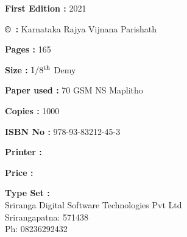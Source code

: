 \begin{center}

\vspace{-.2cm}
{\rm {\bfseries First Edition :} 2021}

\vfill

{\rm {\bfseries \copyright ~:} Karnataka Rajya Vijnana Parishath}

\vfill

{\rm {\bfseries Pages :} 165}

\vfill

{\rm {\bfseries Size :} $1/8^{\rm th}$ Demy}

\vfill

{\rm {\bfseries Paper used :} 70 GSM NS Maplitho}

\vfill

{\rm {\bfseries Copies :} 1000}

\vfill

{\rm {\bfseries ISBN No :} 978-93-83212-45-3} 

\vfill

{\rm {\bfseries Printer :}  }


{\rm {\bfseries Price :}  \rupee\ }

\end{center}

\begin{center}
{\rm {\bfseries Type Set :} \\
			Sriranga Digital Software Technologies Pvt Ltd\\ Srirangapatna: 571438\\ Ph: 08236292432}
   \end{center}
  
   










